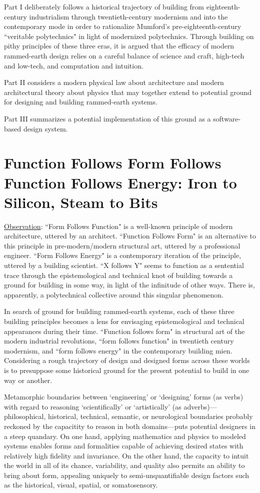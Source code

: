 Part I deliberately follows a historical trajectory of building from eighteenth-century industrialism through twentieth-century modernism and into the contemporary mode in order to rationalize Mumford's pre-eighteenth-century ``veritable polytechnics" in light of modernized polytechnics. Through building on pithy principles of these three eras, it is argued that the efficacy of modern rammed-earth design relies on a careful balance of science and craft, high-tech and low-tech, and computation and intuition.

Part II considers a modern physical law about architecture and modern architectural theory about physics that may together extend to potential ground for designing and building rammed-earth systems.

Part III summarizes a potential implementation of this ground as a software-based design system.

\clearpage

\section{Function Follows Form Follows Function Follows Energy: Iron to Silicon, Steam to Bits}

\underline{Observation}: ``Form Follows Function" is a well-known principle of modern architecture, uttered by an architect. ``Function Follows Form" is an alternative to this principle in pre-modern/modern structural art, uttered by a professional engineer. ``Form Follows Energy" is a contemporary iteration of the principle, uttered by a building scientist. ``X follows Y" seems to function as a sentential trace through the epistemological and technical knot of building towards a ground for building in some way, in light of the infinitude of other ways. There is, apparently, a polytechnical collective around this singular phenomenon.

In search of ground for building rammed-earth systems, each of these three building principles becomes a lens for envisaging epistemological and technical appearances during their time. ``Function follows form" in structural art of the modern industrial revolutions, ``form follows function" in twentieth century modernism, and ``form follows energy" in the contemporary building mien. Considering a rough trajectory of design and designed forms across these worlds is to presuppose some historical ground for the present potential to build in one way or another.

Metamorphic boundaries between `engineering' or `designing' forms (as verbs) with regard to reasoning `scientifically' or `artistically' (as adverbs)---philosophical, historical, technical, semantic, or neurological boundaries probably reckoned by the capacitity to reason in both domains---puts potential designers in a steep quandary. On one hand, applying mathematics and physics to modeled systems enables forms and formalities capable of achieving desired states with relatively high fidelity and invariance. On the other hand, the capacity to intuit the world in all of its chance, variability, and quality also permits an ability to bring about form, appealing uniquely to semi-unquantifiable design factors such as the historical, visual, spatial, or somatosensory.


